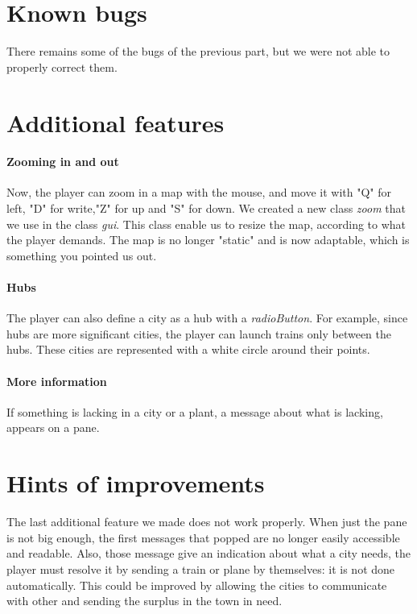 \documentclass[a4paper]{article}
\begin{document}
	\section{Known bugs}
	There remains some of the bugs of the previous part, but we were not able to properly correct them.
	\section{Additional features}
	\paragraph{Zooming in and out}
	Now, the player can zoom in a map with the mouse, and move it with "Q" for left, "D" for write,"Z" for up and "S" for down. We created a new class \textit{zoom} that we use in the class \textit{gui}. This class enable us to resize the map, according to what the player demands. The map is no longer "static" and is now adaptable, which is something you pointed us out.
	\paragraph{Hubs}
	The player can also define a city as a hub with a \textit{radioButton}. For example, since hubs are more significant cities, the player can launch trains only between the hubs. These cities are represented with a white circle around their points.
	\paragraph{More information}
	If something is lacking in a city or a plant, a message about what is lacking, appears on a pane.
	
	\section{Hints of improvements}
	The last additional feature we made does not work properly.
	When just the pane is not big enough, the first messages that popped are no longer easily accessible and readable. Also, those message give an indication about what a city needs, the player must resolve it by sending a train or plane by themselves: it is not done automatically. This could be improved by allowing the cities to communicate with other and sending the surplus in the town in need.
	
\end{document}
